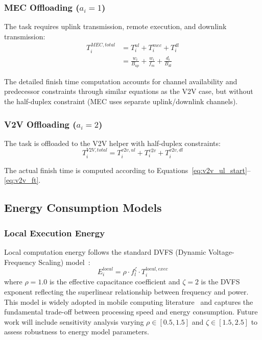 \documentclass[journal,twoside]{IEEEtran}
\begin{document}
\subsubsection{MEC Offloading ($a_i = 1$)}
The task requires uplink transmission, remote execution, and downlink transmission:
    \begin{align}
T_i^{MEC,total} &= T_i^{ul} + T_i^{mec} + T_i^{dl} \\
&= \frac{w_i}{B_{up}} + \frac{w_i}{f_m} + \frac{d_i}{B_{dl}}
    \end{align}

The detailed finish time computation accounts for channel availability and predecessor constraints through similar equations as the V2V case, but without the half-duplex constraint (MEC uses separate uplink/downlink channels).

\subsubsection{V2V Offloading ($a_i = 2$)}
The task is offloaded to the V2V helper with half-duplex constraints:
    \begin{equation}
T_i^{V2V,total} = T_i^{v2v,ul} + T_i^{v2v} + T_i^{v2v,dl}
    \end{equation}

The actual finish time is computed according to Equations~\ref{eq:v2v_ul_start}--\ref{eq:v2v_ft}.

\subsection{Energy Consumption Models}

\subsubsection{Local Execution Energy}
Local computation energy follows the standard DVFS (Dynamic Voltage-Frequency Scaling) model~\cite{zhang2018energy}:
\begin{equation}
E_i^{local} = \rho \cdot f_l^\zeta \cdot T_i^{local,exec}
\label{eq:energy_local}
\end{equation}
where $\rho = 1.0$ is the effective capacitance coefficient and $\zeta = 2$ is the DVFS exponent reflecting the superlinear relationship between frequency and power. This model is widely adopted in mobile computing literature~\cite{zhang2018energy} and captures the fundamental trade-off between processing speed and energy consumption. Future work will include sensitivity analysis varying $\rho \in [0.5, 1.5]$ and $\zeta \in [1.5, 2.5]$ to assess robustness to energy model parameters.
\end{document}
